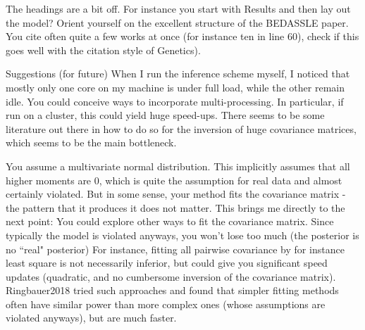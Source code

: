 
\begin{point}{}
    The headings are a bit off. 
For instance you start with Results and then lay out the model? 
Orient yourself on the excellent structure of the BEDASSLE paper.
 You cite often quite a few works at once (for instance ten in line 60), 
 check if this goes well with the citation style of Genetics).
\end{point}


\begin{point}{}
    Suggestions (for future)
 When I run the inference scheme myself, 
 I noticed that mostly only one core on my machine is under full load, while the other remain idle. 
 You could conceive ways to incorporate multi-processing. 
 In particular, if run on a cluster, this could yield huge speed-ups. 
 There seems to be some literature out there in how to do so for the inversion of huge covariance matrices, 
 which seems to be the main bottleneck.
\end{point}

 
\begin{point}{}
    You assume a multivariate normal distribution. 
    This implicitly assumes that all higher moments are 0, 
    which is quite the assumption for real data and almost certainly violated. 
    But in some sense, your method fits the covariance matrix 
    - the pattern that it produces it does not matter. 
    This brings me directly to the next point:
    You could explore other ways to fit the covariance matrix. 
    Since typically the model is violated anyways, 
    you won't lose too much (the posterior is no ``real" posterior)
    For instance, fitting all pairwise covariance by for instance least square 
    is not necessarily inferior, but could give you significant speed updates 
    (quadratic, and no cumbersome inversion of the covariance matrix).
    Ringbauer2018 tried such approaches and found 
    that simpler fitting methods often have similar power than more complex ones 
    (whose assumptions are violated anyways), but are much faster.
\end{point}

